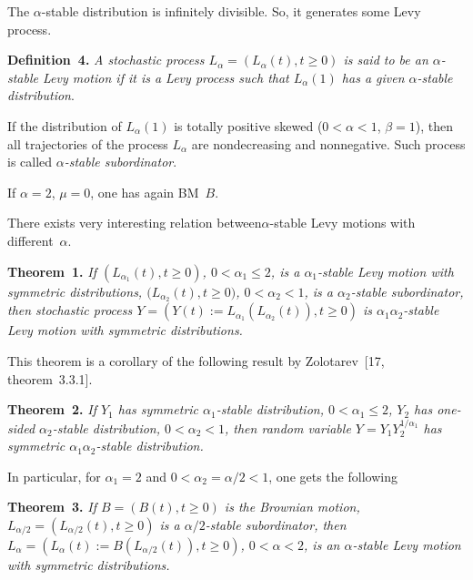 \begin{multicols}{2}
The $\alpha$-stable distribution is infinitely divisible. So, it generates some Levy process. 

\smallskip

\noindent
\textbf{Definition~4.} 
\textit{A stochastic process $L_{\alpha} = (L_{\alpha} (t) , t\geq 0)$ is said to be an 
$\alpha$-stable Levy motion if it is a Levy process such that $L_{\alpha} (1)$ has a given 
$\alpha$-stable distribution}.


\smallskip

If the distribution of $L_{\alpha} (1)$ is totally positive skewed ($0<\alpha <1$, 
$\beta =1$), then all trajectories of the process $L_{\alpha}$ are nondecreasing and 
nonnegative. Such process is called {\it $\alpha$-stable subordinator}. 

If $\alpha =2$, $\mu =0$, one has again BM~$B$. 

There exists very interesting relation between\linebreak $\alpha$-stable Levy motions with 
different~$\alpha$.

\smallskip

\noindent
\textbf{Theorem~1.} 
\textit{If $(L_{\alpha_1 } (t), t\geq 0)$, $0< \alpha_1 \leq 2$, is a $\alpha_1$-stable 
Levy motion with symmetric distributions, 
$(L_{\alpha_2 } (t),$\linebreak $t\geq 0)$, $0<\alpha_2 <1$, is a $\alpha_2$-stable subordinator, 
then stochastic process $Y = (Y(t):= L_{\alpha_1 } (L_{\alpha_2} (t)), t\geq 0)$ 
is $\alpha_1\alpha_2$-stable Levy motion with symmetric distributions.}

\smallskip

This theorem is a corollary of the following result by Zolotarev~[17, theorem~3.3.1]. 

\smallskip

\noindent
\textbf{Theorem~2.} 
\textit{If $Y_1$ has symmetric $\alpha_1$-stable distribution, 
$0<\alpha_1 \leq 2$, $Y_2$ has one-sided 
$\alpha_2$-stable distribution, $0<\alpha_2 <1$, then random variable 
$Y = Y_1 Y_2^{1/\alpha_1}$ has symmetric $\alpha_1\alpha_2$-stable 
distribution.} 

\smallskip

In particular, for $\alpha_1 =2$ and $0<\alpha_2 =\alpha/2 <1$, one gets the following 


\smallskip

\noindent
\textbf{Theorem~3.} 
\textit{If $B= (B(t), t\geq 0)$ is the Brownian motion, 
$L_{\alpha/2} = (L_{\alpha/2} (t) , t\geq 0)$ is a $\alpha/2$-stable subordinator, 
then  $L_{\alpha} = (L_{\alpha} (t) := B(L_{\alpha/2} (t)), t\geq 0)$, $0<\alpha <2$, is 
an $\alpha$-stable Levy motion with  symmetric distributions. }



\end{multicols}
